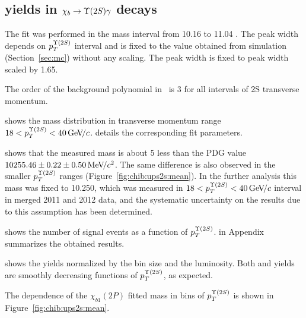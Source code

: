 



\subsection{\texorpdfstring{\chib}{xb} yields in
    \texorpdfstring{$\chib \to \Y2S \gamma$}{xb --> Y(2S) gamma} decays}
\label{sec:chib:ups2s:fit}

The fit was performed in the mass interval from 10.16 \gevcc to 11.04 \gevcc.
The  \chiboneTwoP peak width depends on $p_T^{\Y2S}$ interval and is fixed to
the value obtained from simulation (Section~\ref{sec:mc}) without any scaling.
The \chiboneThreeP peak width is fixed to \chiboneTwoP peak width scaled by
1.65.


The order of the background polynomial in~ is 3 for all
intervals of \Y2S transverse momentum.


 shows the mass distribution in transverse
momentum range $18 < p_T^{\TwoS} < 40 \gevc$. 
details the corresponding fit parameters.




 shows that the measured \chiboneTwoP mass is
about 5 \mevcc less than the PDG value $10255.46  \pm 0.22 \pm 0.50 {\mathrm{\,Me\kern -0.1em V\!/}c^2}$.
The same difference is also observed in the smaller $p_T^{\Y2S}$ ranges
(Figure~\ref{fig:chib:ups2s:mean}).
In the further analysis this mass was fixed to 10.250\gevcc, which was measured
in $18 < p_T^{\Y2S} < 40 \gevc$ interval in merged 2011 and 2012 data, and the
systematic uncertainty on the results due to this assumption has been
determined.



 shows the number of signal events as a function
of $p_T^{\Y2S}$.  in Appendix summarizes the
obtained results.



 shows the yields normalized by the bin
size and the luminosity. Both \chibTwoP and \chibThreeP yields are smoothly
decreasing functions of $p_T^{\Y2S}$, as expected.

The dependence of the $\chi_{b1}(2P)$ fitted mass in bins of $p_T^{\Y2S}$ is
shown in Figure~\ref{fig:chib:ups2s:mean}.


